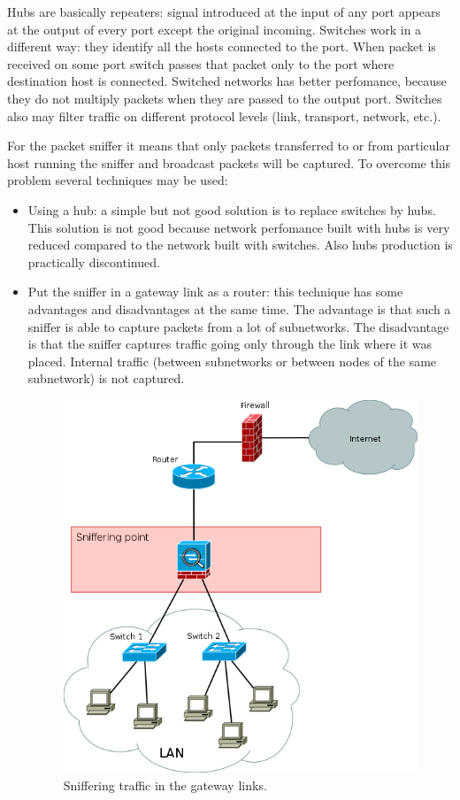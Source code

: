\documentclass[thesis=M,english]{FITthesis}[2011/07/15]
\begin{document}
Hubs are basically repeaters: signal introduced at the input of any port appears at the output of every port except the original incoming. Switches work in a different way: they identify all the hosts connected to the port. When packet is received on some port switch passes that packet only to the port where destination host is connected. Switched networks has better perfomance, because they do not multiply packets when they are passed to the output port. Switches also may filter traffic on different protocol levels (link, transport, network, etc.).

For the packet sniffer it means that only packets transferred to or from particular host running the sniffer and broadcast packets will be captured. To overcome this problem several techniques may be used:

\begin{itemize}
\item Using a hub: a simple but not good solution is to replace switches by hubs. This solution is not good because network perfomance built with hubs is very reduced compared to the network built with switches. Also hubs production is practically discontinued.
\item Put the sniffer in a gateway link as a router: this technique has some advantages and disadvantages at the same time. The advantage is that such a sniffer is able to capture packets from a lot of subnetworks. The disadvantage is that the sniffer captures traffic going only through the link where it was placed. Internal traffic (between subnetworks or between nodes of the same subnetwork) is not captured. 

\begin{figure}[h]
\centering
\includegraphics[scale=0.6]{images/gateway_sniffering.png}
\caption{Sniffering traffic in the gateway links.}
\label{fig:gateway_sniffering}
\end{figure}


\end{itemize}
\end{document}
